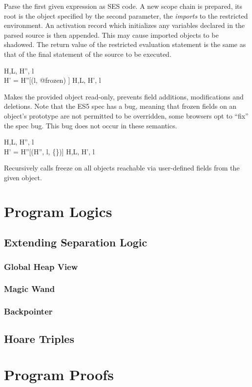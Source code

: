 \documentclass[a4paper,notitlepage]{report}
\begin{document}
Parse the first given expression as SES code.
A new scope chain is prepared, its root is the
object specified by the second parameter, the \emph{imports} to the restricted
environment.
An activation record which initializes any variables declared in the parsed
source is then appended. This may cause imported objects to be shadowed.
The return value of the restricted evaluation statement is the same as that of
the final statement of the source to be executed.

  {H,L, \gevalsto H'', l\\
   H' = H''[(l, @frozen) \pointsto \true]}
  {H,L, \evalsto H', l}

Makes the provided object read-only, prevents field additions,
modifications and deletions.
Note that the ES5 spec has a bug, meaning that frozen fields on an object's
prototype are not permitted to be overridden, some browsers opt to ``fix'' the spec bug.
This bug does not occur in these semantics.

  {H,L, \gevalsto H'', l \\
   H' = H''[\auxDef(H'', l, \{\})]}
  {H,L, \evalsto H', l}

Recursively calls freeze on all objects reachable
via user-defined fields from the given object.

\chapter{Program Logics}
\section{Extending Separation Logic}
\subsection{Global Heap View}
\subsection{Magic Wand}
\subsection{Backpointer}
\section{Hoare Triples}

\chapter{Program Proofs}
\end{document}
